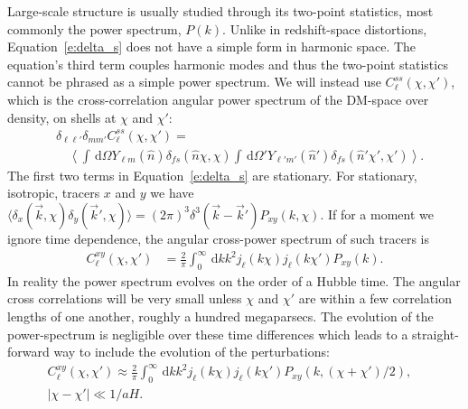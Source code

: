 \documentclass[twocolumn,prl,nofootinbib,floatfix]{revtex4-1}
\newcommand{\ud}{\,\mathrm{d}}
\begin{document}
Large-scale structure is usually studied through its two-point statistics, most
commonly the power spectrum, $P(k)$.
Unlike in redshift-space distortions, Equation~\ref{e:delta_s} does not have a
simple form in harmonic space. The equation's third term couples harmonic modes
and thus the two-point statistics cannot be phrased as a simple power spectrum.
We will instead use $C^{ss}_\ell(\chi,\chi')$, which is
the cross-correlation angular power spectrum of the DM-space over density,
on shells at $\chi$ and $\chi'$:
\begin{align}
    &\delta_{\ell\ell'}\delta_{mm'}C^{ss}_\ell(\chi, \chi') = \nonumber \\
    & \quad
        \left\langle
        \int\ud\Omega Y_{\ell m}(\hat n)
       \delta_{fs}(\hat n \chi, \chi)
        \int\ud\Omega' Y_{\ell' m'}(\hat n')
        \delta_{fs}(\hat n' \chi', \chi')
        \right\rangle.
\end{align}
The first two terms in Equation~\ref{e:delta_s} are stationary. For stationary,
isotropic, tracers $x$ and $y$ we have 
$\langle \delta_x(\vec k, \chi) \delta_y(\vec k', \chi) \rangle = (2\pi)^3
\delta^3(\vec k - \vec k') P_{xy}(k, \chi)$.  If for a moment we ignore time
dependence, the angular cross-power spectrum of such tracers is
\begin{align}
    C^{xy}_\ell(\chi,\chi')
    &= \frac{2}{\pi}
\int_0^\infty\ud k k^2 j_\ell(k\chi) j_{\ell}(k\chi')P_{xy}(k).
\end{align}
In reality the power spectrum evolves on the order of a Hubble time.
The angular cross correlations will be very small unless $\chi$ and $\chi'$ are
within a few correlation lengths of one another, roughly a hundred
megaparsecs.  The evolution of the power-spectrum is negligible over these time
differences which leads to a straight-forward way to include the evolution of
the perturbations:
\begin{align}
C^{xy}_\ell(\chi,\chi') 
    \approx \frac{2}{\pi}
    \int_0^\infty\ud k k^2
    j_\ell(k\chi) j_{\ell}(k\chi')
    P_{xy}(k,(\chi + \chi')/2),\nonumber &\\
    |\chi - \chi'| \ll 1/aH.&
\end{align}
\end{document}
